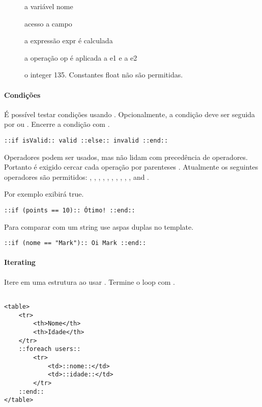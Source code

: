 {\begin{description}
	\item[] a variável nome
	\item[] acesso a campo
	\item[] a expressão expr é calculada
	\item[] a operação op é aplicada a e1 e a e2
	\item[] o integer 135. Constantes float não são permitidas.
\end{description}

\paragraph{Condições}
É possível testar condições usando . Opcionalmente, a condição deve ser seguida por  ou . Encerre a condição com .

\begin{lstlisting} 
::if isValid:: valid ::else:: invalid ::end::
\end{lstlisting} 

Operadores podem ser usados, mas não lidam com precedência de operadores. Portanto é exigido cercar cada operação por parenteses \ic{()}. Atualmente os seguintes operadores são permitidos: \ic{+}, \ic{-}, \ic{*}, \ic{/}, \ic{>}, \ic{<},  \ic{>=}, \ic{<=}, \ic{==}, \ic{!=}, \ic{&&} and \ic{||}.

Por exemplo  exibirá true.

\begin{lstlisting} 
::if (points == 10):: Ótimo! ::end::
\end{lstlisting} 

Para comparar com um string use aspas duplas no template.
\begin{lstlisting} 
::if (nome == "Mark"):: Oi Mark ::end::
\end{lstlisting} 

\paragraph{Iterating}
Itere em uma estrutura ao usar . Termine o loop com .
\begin{lstlisting} 

<table>
	<tr>
		<th>Nome</th>
		<th>Idade</th>
	</tr>
	::foreach users::
		<tr>
			<td>::nome::</td>
			<td>::idade::</td>
		</tr>
	::end::
</table>
\end{lstlisting} 

}
